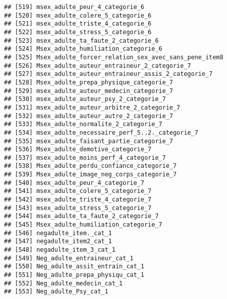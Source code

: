 \documentclass[
]{article}
\begin{document}
\begin{verbatim}
## [519] msex_adulte_peur_4_categorie_6                                   
## [520] msex_adulte_colere_5_categorie_6                                 
## [521] msex_adulte_triste_4_categorie_6                                 
## [522] msex_adulte_stress_5_categorie_6                                 
## [523] msex_adulte_ta_faute_2_categorie_6                               
## [524] Msex_adulte_humiliation_categorie_6                              
## [525] Msex_adulte_forcer_relation_sex_avec_sans_pene_item8             
## [526] Msex_adulte_auteur_entraineur_2_categorie_7                      
## [527] msex_adulte_auteur_entraineur_assis_2_categorie_7                
## [528] Msex_adulte_prepa_physique_categorie_7                           
## [529] msex_adulte_auteur_medecin_categorie_7                           
## [530] msex_adulte_auteur_psy_2_categorie_7                             
## [531] msex_adulte_auteur_arbitre_2_categorie_7                         
## [532] msex_adulte_auteur_autre_2_categorie_7                           
## [533] Msex_adulte_normalite_2_categorie_7                              
## [534] msex_adulte_necessaire_perf_5..2._categorie_7                    
## [535] msex_adulte_faisant_partie_categorie_7                           
## [536] Msex_adulte_demotive_categorie_7                                 
## [537] msex_adulte_moins_perf_4_categorie_7                             
## [538] Msex_adulte_perdu_confiance_categorie_7                          
## [539] Msex_adulte_image_neg_corps_categorie_7                          
## [540] msex_adulte_peur_4_categorie_7                                   
## [541] msex_adulte_colere_5_categorie_7                                 
## [542] msex_adulte_triste_4_categorie_7                                 
## [543] msex_adulte_stress_5_categorie_7                                 
## [544] msex_adulte_ta_faute_2_categorie_7                               
## [545] Msex_adulte_humiliation_categorie_7                              
## [546] negadulte_item._cat_1                                            
## [547] negadulte_item2_cat_1                                            
## [548] negadulte_item_3_cat_1                                           
## [549] Neg_adulte_entraineur_cat_1                                      
## [550] Neg_adulte_assit_entrain_cat_1                                   
## [551] Neg_adulte_prepa_physiqu_cat_1                                   
## [552] Neg_adulte_medecin_cat_1                                         
## [553] Neg_adulte_Psy_cat_1                                             

\end{verbatim}
\end{document}
